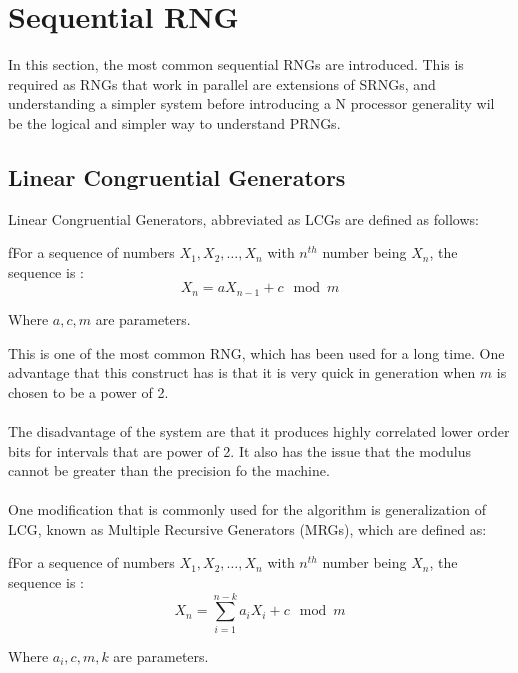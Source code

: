 \chapter{Sequential RNG}
In this section, the most common sequential RNGs are 
introduced. This is required as RNGs that work in parallel 
are extensions of SRNGs, and understanding a simpler system 
before introducing a N processor generality wil be the 
logical and simpler way to understand PRNGs.

\section{Linear Congruential Generators}
Linear Congruential Generators, abbreviated as LCGs are 
defined as follows:

\begin{definition}
    fFor a sequence of numbers $X_1,X_2, \dots, X_n $ with 
    $n^{th}$ number being $X_n$, 
    the sequence is :\\
    \begin{equation*}
        X_n = aX_{n-1} + c \mod m
    \end{equation*}

    \noindent Where $a,c,m$ are parameters.
\end{definition}

\noindent This is one of the most common RNG, which has been 
used for a long time. One advantage that this construct has 
is that it is very quick in generation when $m$ is chosen 
to be a power of 2.
\\\\
The disadvantage of the system are that it produces highly 
correlated lower order bits for intervals that are power of 
2. It also has the issue that the modulus cannot be greater 
than the precision fo the machine.
\\\\
One modification that is commonly used for the algorithm is 
generalization of LCG, known as Multiple Recursive Generators 
(MRGs), which are defined as:

\begin{definition}
    fFor a sequence of numbers $X_1,X_2, \dots, X_n $ with 
    $n^{th}$ number being $X_n$, 
    the sequence is :\\
    \begin{equation*}
        X_n = \sum_{i=1}^{n-k} a_iX_{i} + c \mod m
    \end{equation*}

    \noindent Where $a_i,c,m,k$ are parameters.
\end{definition}

